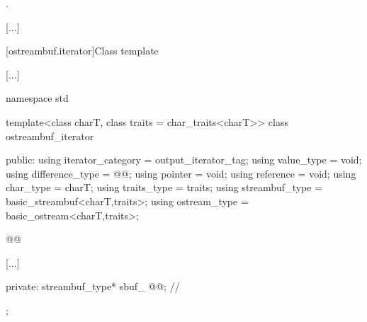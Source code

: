 \begin{itemdescr}
\pnum
\returns
{}.
\end{itemdescr}

[...]

[ostreambuf.iterator]{Class template }

[...]

%
\begin{codeblock}
namespace std {
  template<class charT, class traits = char_traits<charT>>
  class ostreambuf_iterator {
  public:
    using iterator_category = output_iterator_tag;
    using value_type        = void;
    using difference_type   = @@;
    using pointer           = void;
    using reference         = void;
    using char_type         = charT;
    using traits_type       = traits;
    using streambuf_type    = basic_streambuf<charT,traits>;
    using ostream_type      = basic_ostream<charT,traits>;

    @@

    [...]

  private:
    streambuf_type* sbuf_ @@;                // \expos
  };
}
\end{codeblock}
